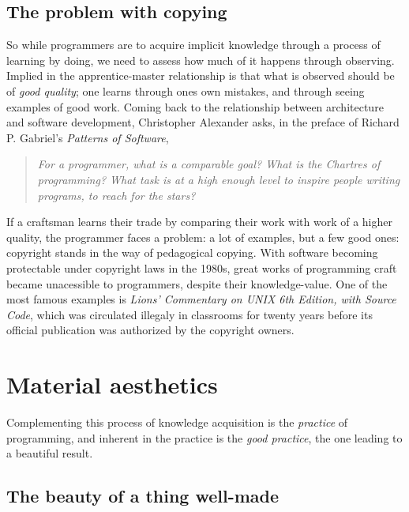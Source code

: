\documentclass{article}
\begin{document}
\subsection{The problem with copying}

So while programmers are to acquire implicit knowledge through a process of learning by doing, we need to assess how much of it happens through observing. Implied in the apprentice-master relationship is that what is observed should be of \textit{good quality}; one learns through ones own mistakes, and through seeing examples of good work. Coming back to the relationship between architecture and software development, Christopher Alexander asks, in the preface of Richard P. Gabriel's \textit{Patterns of Software}\cite{gabriel_patterns_1998},

\begin{quote}
    \textit{For a programmer, what is a comparable goal? What is the Chartres of programming? What task is at a high enough level to inspire people writing programs, to reach for the stars?}
\end{quote}

If a craftsman learns their trade by comparing their work with work of a higher quality, the programmer faces a problem: a lot of examples, but a few good ones\cite{taylor_patterns_2001}: copyright stands in the way of pedagogical copying. With software becoming protectable under copyright laws in the 1980s\cite{oman_computer_2018}, great works of programming craft became unacessible to programmers, despite their knowledge-value\cite{gabriel_mob_2001}. One of the most famous examples is \emph{Lions' Commentary on UNIX 6th Edition, with Source Code}, which was circulated illegaly in classrooms for twenty years before its official publication was authorized by the copyright owners\cite{lions_lions_1996}.

\section{Material aesthetics}

Complementing this process of knowledge acquisition is the \emph{practice} of programming, and inherent in the practice is the \emph{good practice}, the one leading to a beautiful result.

\subsection{The beauty of a thing well-made}
\end{document}
